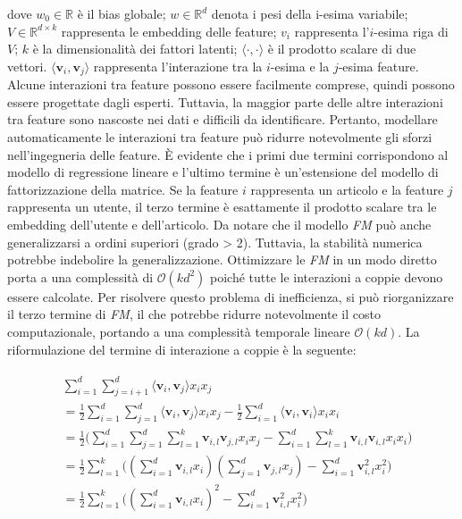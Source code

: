 dove $w_0 \in \mathbb{R}$ è il bias globale; $w \in \mathbb{R}^d$ denota i pesi della i-esima variabile; $V \in \mathbb{R}^{d\times k}$ rappresenta le embedding delle feature; $v_i$ rappresenta l'$i$-esima riga di $V$; $k$ è la dimensionalità dei fattori latenti; $\langle\cdot, \cdot \rangle$ è il prodotto scalare di due vettori. $\langle \mathbf{v}_i, \mathbf{v}_j \rangle$ rappresenta l'interazione tra la $i$-esima e la $j$-esima feature. Alcune interazioni tra feature possono essere facilmente comprese, quindi possono essere progettate dagli esperti. Tuttavia, la maggior parte delle altre interazioni tra feature sono nascoste nei dati e difficili da identificare. Pertanto, modellare automaticamente le interazioni tra feature può ridurre notevolmente gli sforzi nell'ingegneria delle feature. È evidente che i primi due termini corrispondono al modello di regressione lineare e l'ultimo termine è un'estensione del modello di fattorizzazione della matrice. Se la feature $i$ rappresenta un articolo e la feature $j$ rappresenta un utente, il terzo termine è esattamente il prodotto scalare tra le embedding dell'utente e dell'articolo. Da notare che il modello \textit{FM} può anche generalizzarsi a ordini superiori (grado > 2). Tuttavia, la stabilità numerica potrebbe indebolire la generalizzazione. Ottimizzare le \textit{FM} in un modo diretto porta a una complessità di $\mathcal{O}(kd^2)$ poiché tutte le interazioni a coppie devono essere calcolate. Per risolvere questo problema di inefficienza, si può riorganizzare il terzo termine di \textit{FM}, il che potrebbe ridurre notevolmente il costo computazionale, portando a una complessità temporale lineare $\mathcal{O}(kd)$. La riformulazione del termine di interazione a coppie è la seguente:

\[
\begin{split}\begin{aligned}
&\sum_{i=1}^d \sum_{j=i+1}^d \langle\mathbf{v}_i, \mathbf{v}_j\rangle x_i x_j \\
 &= \frac{1}{2} \sum_{i=1}^d \sum_{j=1}^d\langle\mathbf{v}_i, \mathbf{v}_j\rangle x_i x_j - \frac{1}{2}\sum_{i=1}^d \langle\mathbf{v}_i, \mathbf{v}_i\rangle x_i x_i \\
 &= \frac{1}{2} \big (\sum_{i=1}^d \sum_{j=1}^d \sum_{l=1}^k\mathbf{v}_{i, l} \mathbf{v}_{j, l} x_i x_j - \sum_{i=1}^d \sum_{l=1}^k \mathbf{v}_{i, l} \mathbf{v}_{i, l} x_i x_i \big)\\
 &=  \frac{1}{2} \sum_{l=1}^k \big ((\sum_{i=1}^d \mathbf{v}_{i, l} x_i) (\sum_{j=1}^d \mathbf{v}_{j, l}x_j) - \sum_{i=1}^d \mathbf{v}_{i, l}^2 x_i^2 \big ) \\
 &= \frac{1}{2} \sum_{l=1}^k \big ((\sum_{i=1}^d \mathbf{v}_{i, l} x_i)^2 - \sum_{i=1}^d \mathbf{v}_{i, l}^2 x_i^2)
 \end{aligned}\end{split}
\]

